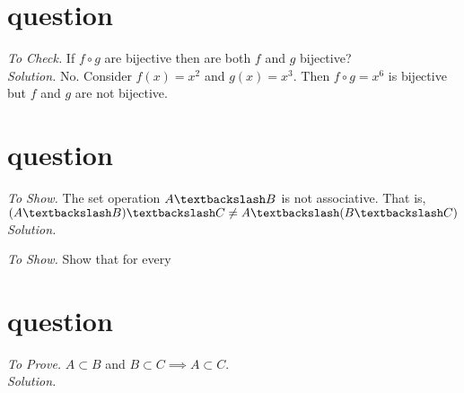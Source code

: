 \documentclass[11pt]{article}
\begin{document}
\section{question}
\emph{To Check. }If $f \circ g$ are bijective then are both $f$ and $g$ bijective? \medskip \\
\emph{Solution. } No. Consider $f(x) = x^2$ and $g(x) = x^3$. Then $f \circ g = x^6$ is bijective but $f$ and $g$ are not bijective.


\section{question}
\emph{To Show. } The set operation $A \textbackslash B$ is not associative. That is, $(A \textbackslash B) \textbackslash C \neq A \textbackslash (B \textbackslash C)$ \medskip \\
\emph{Solution. }


\vspace{50pt}
\noindent \emph{To Show. } Show that for every


\section{question}
\emph{To Prove. } $A \subset B$ and $B \subset C \implies A \subset C$. \medskip \\
\emph{Solution. }
\end{document}
